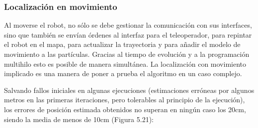 \subsubsection{Localización en movimiento}
Al moverse el robot, no sólo se debe gestionar la comunicación con sus interfaces, sino que también se envían órdenes al interfaz para el teleoperador, para repintar el robot en el mapa, para actualizar la trayectoria y para añadir el modelo de movimiento a las partículas. Gracias al tiempo de evolución y a la programación multihilo esto es posible de manera simultánea. La localización con movimiento implicado es una manera de poner a prueba el algoritmo en un caso complejo.

Salvando fallos iniciales en algunas ejecuciones (estimaciones erróneas por algunos metros en las primeras iteraciones, pero tolerables al principio de la ejecución), los errores de posición estimada obtenidos no superan en ningún caso los 20cm, siendo la media de menos de 10cm (Figura 5.21):


